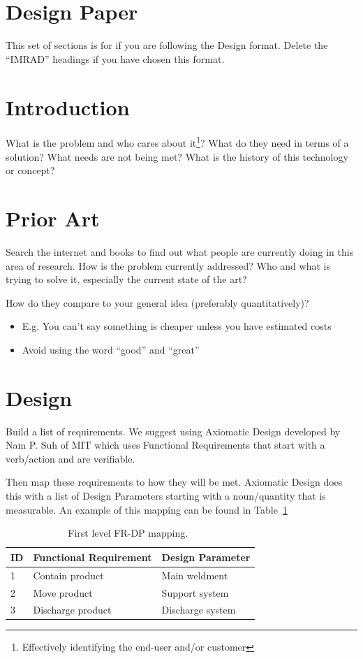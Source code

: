 \documentclass[conference,a4paper]{IEEEtran}
\begin{document}
\section*{Design Paper}
This set of sections is for if you are following the Design format.
Delete the ``IMRAD'' headings if you have chosen this format.

\section{Introduction}\label{sec:introduction2}
What is the problem and who cares about it\footnote{Effectively identifying the end-user and/or customer}?
What do they need in terms of a solution?
What needs are not being met?
What is the history of this technology or concept?

\section{Prior Art}\label{sec:priorart}
Search the internet and books to find out what people are currently doing in this area of research.
How is the problem currently addressed?  
Who and what is trying to solve it, especially the current state of the art?  

How do they compare to your general idea (preferably quantitatively)?
\begin{itemize}
\item E.g. You can’t say something is cheaper unless you have estimated costs
\item Avoid using the word “good” and “great”
\end{itemize}

\section{Design}\label{sec:design}
Build a list of requirements.
We suggest using Axiomatic Design developed by Nam P. Suh of MIT which uses Functional Requirements that start with a verb/action and are verifiable\cite{suh1990principles,suh1998adsystems,suh2005complexity}.

Then map these requirements to how they will be met.
Axiomatic Design does this with a list of Design Parameters starting with a noun/quantity that is measurable.
An example of this mapping can be found in Table~\ref{tab:first_level-frdp}

\begin{table}
  \center
  \caption{First level FR-DP mapping.~\cite{gerhard2016suretrack}}\label{tab:first_level-frdp}
  \begin{tabular}{lll} \toprule
    ID& Functional Requirement & Design Parameter \\ \midrule 
    1&Contain product&Main weldment\\
    2&Move product&Support system\\
    3&Discharge product &Discharge system\\
    \bottomrule
  \end{tabular}
\end{table}
\end{document}
